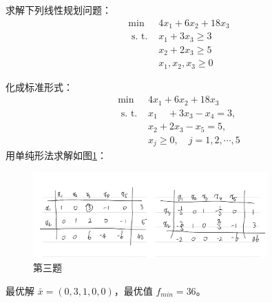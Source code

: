 \begin{problem}
    求解下列线性规划问题：
    \[\begin{array}{lc}
        \min & 4 x_{1}+6 x_{2}+18 x_{3} \\
        \text { s. t. } & x_{1}+3 x_{3} \geqslant 3 \\
        & x_{2}+2x_3 \geqslant 5 \\
        & x_{1}, x_{2}, x_{3} \geqslant 0
    \end{array}\]
\end{problem}
\begin{solution}
    化成标准形式：
    \[\begin{array}{ll}
        \min & 4 x_{1}+6 x_{2}+18 x_{3} \\
        \text { s. t. } & x_{1} \quad+3 x_{3}-x_{4}=3, \\
        & x_{2}+2 x_{3}-x_{5}=5, \\
        &x_{j} \geqslant 0, \quad j=1,2, \cdots, 5
    \end{array}\]
    用单纯形法求解如图\ref{fig3}：
    \begin{figure}[htbp]
        \centering
        \includegraphics[width=0.8\textwidth]{./figures/img3.png}
        \caption{第三题 \label{fig3}}
    \end{figure}
    最优解 $\bar{x} = (0, 3, 1, 0, 0)$，最优值 $f_{min} = 36$。
    
\end{solution}

